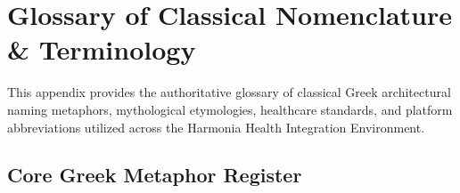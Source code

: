 
\chapter{Glossary of Classical Nomenclature \& Terminology}
\label{app:glossary}

This appendix provides the authoritative glossary of classical Greek architectural naming metaphors, mythological etymologies, healthcare standards, and platform abbreviations utilized across the Harmonia Health Integration Environment.

\section{Core Greek Metaphor Register}

